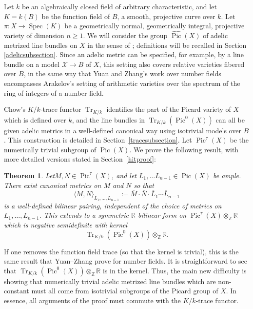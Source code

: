 \documentclass[times, doublespace]{amsart}
\numberwithin{equation}{section}
\theoremstyle{plain}
\newtheorem{theorem}[equation]{Theorem}
\theoremstyle{definition}
\DeclareMathOperator{\Spec}{Spec}
\DeclareMathOperator{\Pic}{Pic}
\newcommand{\Tr}{\operatorname{Tr}}
\newcommand{\R}{\mathbb{R}}
\newcommand{\Z}{\mathbb{Z}}
\newcommand{\cX}{\mathcal{X}}
\begin{document}
 Let $k$ be an algebraically closed field of arbitrary characteristic, and let $K=k(B)$ be the function field of $B$, a smooth, projective curve over $k$. Let $\pi:X\to\Spec (K)$ be a geometrically normal, geometrically integral, projective variety of dimension $n\ge1$. We will consider the group $\widehat{\Pic}(X)$ of adelic metrized line bundles on $X$ in the sense of \cite{Z95}; definitions will be recalled in Section \ref{adelicsubsection}.  Since an adelic metric can be specified, for example, by a line bundle on a model $\cX\to B$ of $X$, this setting also covers relative varieties fibered over $B$, in the same way that Yuan and Zhang's work over number fields encompasses Arakelov's setting of arithmetic varieties over the spectrum of the ring of integers of a number field. 
 
 Chow's $K/k$-trace functor $\Tr_{K/k}$ identifies the part of the Picard variety of $X$ which is defined over $k$, and the line bundles in $\Tr_{K/k}(\Pic^0(X))$ can all be given adelic metrics in a well-defined canonical way using isotrivial models over $B$. This construction is detailed in Section~\ref{tracesubsection}. Let $\Pic^{\tau}(X)$ be the numerically trivial subgroup of $\Pic(X)$. We prove the following result, with more detailed versions stated in Section~\ref{hitproof}:
 \begin{theorem}
 Let$M,N\in\Pic^{\tau}(X)$, and let $L_1,\dots L_{n-1}\in\Pic(X)$ be ample. There exist canonical metrics on $M$ and $N$ so that 
  \[\langle M,N\rangle_{L_1,\dots,L_{n-1}}:=\overline M\cdot\overline N\cdot\overline L_1\cdots\overline L_{n-1}\]
 is a well-defined bilinear pairing, independent of the choice of metrics on $L_1,\dots, L_{n-1}$. This extends to a symmetric $\R$-bilinear form on $\Pic^{\tau}(X)\otimes_{\Z}\R$ which is negative semidefinite with kernel 
\[ \Tr_{K/k}(\Pic^0(X))\otimes_{\Z}\R.\]
 \end{theorem}
%
 If one removes the function field trace (so that the kernel is trivial), this is the same result that Yuan--Zhang prove for number fields. It is straightforward to see that $\Tr_{K/k}(\Pic^0(X))\otimes_{\Z}\R$ is in the kernel. Thus, the main new difficulty is showing that numerically trivial adelic metrized line bundles which are non-constant must all come from isotrivial subgroups of the Picard group of $X$. In essence, all arguments of the proof must commute with the $K/k$-trace functor.
 
\end{document}
